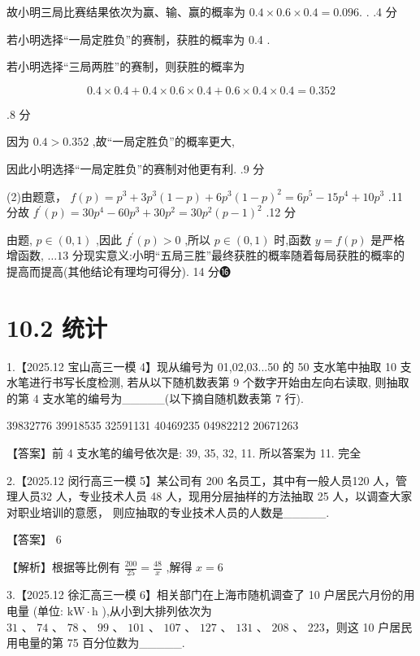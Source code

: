 \documentclass[10pt]{article}
\newcommand*\circled[1]{\tikz[baseline=(char.base)]{\node[shape=circle,draw,inner sep=1.5pt] (char) {\small #1};}}
\begin{document}
故小明三局比赛结果依次为赢、输、赢的概率为 \({0.4} \times  {0.6} \times  {0.4} = {0.096}.\) . .4 分

 \circled{2} 若小明选择“一局定胜负”的赛制，获胜的概率为 0.4 .

若小明选择“三局两胜”的赛制，则获胜的概率为

\[
{0.4} \times  {0.4} + {0.4} \times  {0.6} \times  {0.4} + {0.6} \times  {0.4} \times  {0.4} = {0.352}
\]

.8 分

因为 \({0.4} > {0.352}\) ,故“一局定胜负”的概率更大,

因此小明选择“一局定胜负”的赛制对他更有利. .9 分

(2)由题意， \(f\left( p\right)  = {p}^{3} + 3{p}^{3}\left( {1 - p}\right)  + 6{p}^{3}{\left( 1 - p\right) }^{2} = 6{p}^{5} - {15}{p}^{4} + {10}{p}^{3}\) .11 分故 \({f}^{\prime }\left( p\right)  = {30}{p}^{4} - {60}{p}^{3} + {30}{p}^{2} = {30}{p}^{2}{\left( p - 1\right) }^{2}\) .12 分

由题, \(p \in  \left( {0,1}\right)\) ,因此 \({f}^{\prime }\left( p\right)  > 0\) ,所以 \(p \in  \left( {0,1}\right)\) 时,函数 \(y = f\left( p\right)\) 是严格增函数, \(\ldots {13}\) 分现实意义:小明“五局三胜”最终获胜的概率随着每局获胜的概率的提高而提高(其他结论有理均可得分). 14 分⓰

\section*{10.2 统计}

1.【2025.12 宝山高三一模 4】现从编号为 01,02,03...50 的 50 支水笔中抽取 10 支水笔进行书写长度检测, 若从以下随机数表第 9 个数字开始由左向右读取, 则抽取的第 4 支水笔的编号为\_\_\_\_\_(以下摘自随机数表第 7 行).

39832776 39918535 32591131 40469235 04982212 20671263

【答案】前 4 支水笔的编号依次是: 39, 35, 32, 11. 所以答案为 11. 完全

2.【2025.12 闵行高三一模 5】某公司有 200 名员工，其中有一般人员120 人，管理人员32 人，专业技术人员 48 人，现用分层抽样的方法抽取 25 人，以调查大家对职业培训的意愿， 则应抽取的专业技术人员的人数是\_\_\_\_\_.

【答案】 6

【解析】根据等比例有 \(\frac{200}{25} = \frac{48}{x}\) ,解得 \(x = 6\)

3.【2025.12 徐汇高三一模 6】相关部门在上海市随机调查了 10 户居民六月份的用电量 (单位: \(\mathrm{{kW}} \cdot  \mathrm{h}\) ),从小到大排列依次为 \({31}\text{ 、 }{74}\text{ 、 }{78}\text{ 、 }{99}\text{ 、 }{101}\text{ 、 }{107}\text{ 、 }{127}\text{ 、 }{131}\text{ 、 }{208}\) 、 223，则这 10 户居民用电量的第 75 百分位数为\_\_\_\_\_.
\end{document}

